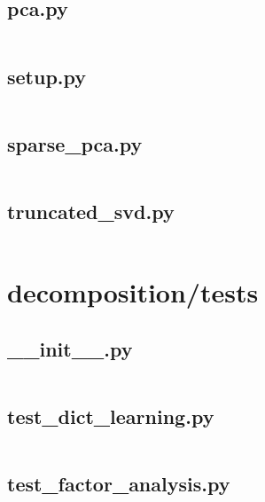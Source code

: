 \documentclass{article}
\begin{document}
\subsection{pca.py}
\inputminted{python}{/home/dufferzafar/dev/@clones/scikit-learn/sklearn/decomposition/pca.py}
\newpage

\subsection{setup.py}
\inputminted{python}{/home/dufferzafar/dev/@clones/scikit-learn/sklearn/decomposition/setup.py}
\newpage

\subsection{sparse\_pca.py}
\inputminted{python}{/home/dufferzafar/dev/@clones/scikit-learn/sklearn/decomposition/sparse_pca.py}
\newpage

\subsection{truncated\_svd.py}
\inputminted{python}{/home/dufferzafar/dev/@clones/scikit-learn/sklearn/decomposition/truncated_svd.py}
\newpage

\section{decomposition/tests}

\subsection{\_\_init\_\_.py}
\inputminted{python}{/home/dufferzafar/dev/@clones/scikit-learn/sklearn/decomposition/tests/__init__.py}
\newpage

\subsection{test\_dict\_learning.py}
\inputminted{python}{/home/dufferzafar/dev/@clones/scikit-learn/sklearn/decomposition/tests/test_dict_learning.py}
\newpage

\subsection{test\_factor\_analysis.py}
\inputminted{python}{/home/dufferzafar/dev/@clones/scikit-learn/sklearn/decomposition/tests/test_factor_analysis.py}
\newpage
\end{document}
